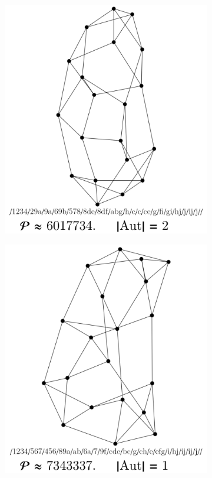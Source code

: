 \documentclass[12pt,a4paper]{article}
\renewcommand{\|}{\rule[-0.4ex]{0.2ex}{1.2em}}
\begin{document}
\begin{figure}[htb]
\begin{subfigure}[b]{.24 \textwidth}
		\subcaption{}
	\end{subfigure}
	\begin{subfigure}[b]{.24 \textwidth}
		\includegraphics[width=\linewidth]{largest_18_2}
		\subcaption{}
	\end{subfigure}
	\begin{subfigure}[b]{.24 \textwidth}
		\includegraphics[width=\linewidth]{largest_18_1}
		\subcaption{}
	\end{subfigure}
	

\end{figure}
\end{document}
